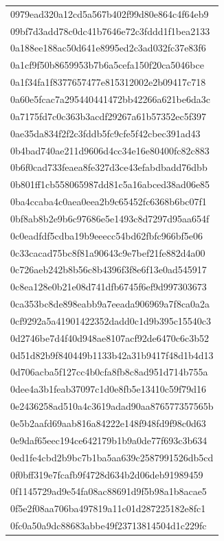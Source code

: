 \begin{tabular}{l}
0979ead320a12cd5a567b402f99d80e864c4f64eb9 \\
09bf7d3add78c0dc41b7646e72c3fddd1f1bea2133 \\
0a188ee188ac50d641e8995ed2c3ad032fc37e83f6 \\
0a1cf9f50b8659953b7b6a5cefa150f20ca5046bce \\
0a1f34fa1f8377657477e815312002e2b09417c718 \\
0a60e5fcac7a295440441472bb42266a621be6da3c \\
0a7175fd7c0c363b3acdf29267a61b57352ec5f397 \\
0ae35da834f2f2c3fddb5fc9cfe5f42cbec391ad43 \\
0b4bad740ae211d9606d4cc34e16e80400fc82c883 \\
0b6f0cad733feaea8fe327d3ce43efabdbadd76dbb \\
0b801ff1cb558065987dd81c5a16abced38ad06e85 \\
0ba4ccaba4c0aea0eea2b9c65452fc6368b6bc07f1 \\
0bf8ab8b2e9b6c97686e5e1493c8d7297d95aa654f \\
0c0eadfdf5cdba19b9eeecc54bd62fbfc966bf5e06 \\
0c33cacad75bc8f81a90643c9e7bef21fe882d4a00 \\
0c726aeb242b8b56c8b4396f3f8e6f13e0ad545917 \\
0c8ea128e0b21e08d741dfb6745f6ef9d997303673 \\
0ca353bc8de898eabb9a7eeada906969a7f8ca0a2a \\
0cf9292a5a41901422352dadd0c1d9b395c15540c3 \\
0d2746be7d4f40d948ae8107acf92de6470c6c3b52 \\
0d51d82b9f840449b1133b42a31b9417f48d1b4d13 \\
0d706acba5f127cc4b0cfa8fb8c8ad951d714b755a \\
0dee4a3b1feab37097c1d0e8fb5e13410c59f79d16 \\
0e2436258ad510a4c3619adad90aa876577357565b \\
0e5b2aafd69aab816a84222e148f948fd9f98c0d63 \\
0e9daf65eec194ce642179b1b9a0de77f693c3b634 \\
0ed1fe4cbd2b9bc7b1ba5aa639c2587991526db5cd \\
0f0bff319e7fcafb9f4728d634b2d06deb91989459 \\
0f1145729ad9e54fa08ac88691d9f5b98a1b8acae5 \\
0f5e2f08aa706ba497819a11c01d287225182e8fc1 \\
0fc0a50a9dc88683abbe49f23713814504d1c229fc \\

\end{tabular}
